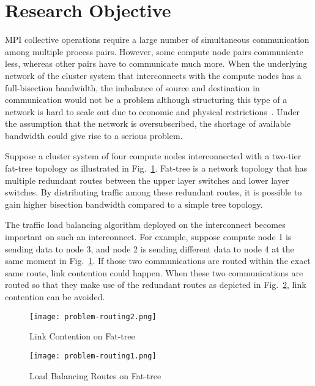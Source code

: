 \section{Research Objective}\label{sec:iii-background}

MPI collective operations require a large number of simultaneous communication
among multiple process pairs. However, some compute node pairs communicate
less, whereas other pairs have to communicate much more. When the underlying
network of the cluster system that interconnects with the compute nodes has a
full-bisection bandwidth, the imbalance of source and destination in
communication would not be a problem although structuring this type of a
network is hard to scale out due to economic and physical
restrictions~\autocite{Al-Fares2008}. Under the assumption that the network is
oversubscribed, the shortage of available bandwidth could give rise to a
serious problem.

Suppose a cluster system of four compute nodes interconnected with a
two-tier fat-tree topology as illustrated in Fig.~\ref{fig:problem-routing1}.
Fat-tree is a network topology that has multiple redundant routes between the
upper layer switches and lower layer switches. By distributing traffic among
these redundant routes, it is possible to gain higher bisection bandwidth
compared to a simple tree topology.

The traffic load balancing algorithm deployed on the interconnect becomes
important on such an interconnect. For example, suppose compute node 1 is
sending data to node 3, and node 2 is sending different data to node 4 at the
same moment in Fig.~\ref{fig:problem-routing1}. If those two communications
are routed within the exact same route, link contention could happen. When
these two communications are routed so that they make use of the redundant
routes as depicted in Fig.~\ref{fig:problem-routing2}, link contention can be
avoided.

\begin{figure}
    \centering
    \texttt{[image: problem-routing2.png]}
    \caption{Link Contention on Fat-tree}%
    \label{fig:problem-routing1}
\end{figure}

\begin{figure}
    \centering
    \texttt{[image: problem-routing1.png]}
    \caption{Load Balancing Routes on Fat-tree}%
    \label{fig:problem-routing2}
\end{figure}


